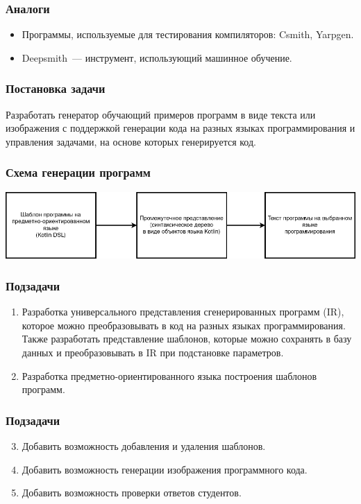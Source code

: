 \documentclass[14pt,aspectratio=169,hyperref={pdftex,unicode},xcolor=dvipsnames]{beamer}
\begin{document}
\begin{frame}
    \frametitle{Аналоги}
    \begin{itemize}
        \item Программы, используемые для тестирования компиляторов: Csmith, Yarpgen.
        \item Deepsmith~--- инструмент, использующий машинное обучение.
    \end{itemize}
\end{frame}

\begin{frame}
    \frametitle{Постановка задачи}
    Разработать генератор обучающий примеров программ в виде текста или изображения с поддержкой
    генерации кода на разных языках программирования и управления задачами, на основе
    которых генерируется код.
\end{frame}

\begin{frame}
    \frametitle{Схема генерации программ}
    \begin{center}
        \includegraphics[width=\textwidth]{images/generation-steps.drawio.png}
    \end{center}
\end{frame}

\begin{frame}
    \frametitle{Подзадачи}
    \begin{enumerate}
        \item Разработка универсального представления сгенерированных программ (IR), которое можно
              преобразовывать в код на разных языках программирования. Также разработать представление шаблонов,
              которые можно сохранять в базу данных и преобразовывать в IR при подстановке параметров.
        \item Разработка предметно-ориентированного языка построения шаблонов программ.
    \end{enumerate}
\end{frame}

\begin{frame}
    \frametitle{Подзадачи}
    \begin{enumerate}
        \setcounter{enumi}{2}
        \item Добавить возможность добавления и удаления шаблонов.
        \item Добавить возможность генерации изображения программного кода.
        \item Добавить возможность проверки ответов студентов.
    \end{enumerate}
\end{frame}
\end{document}

